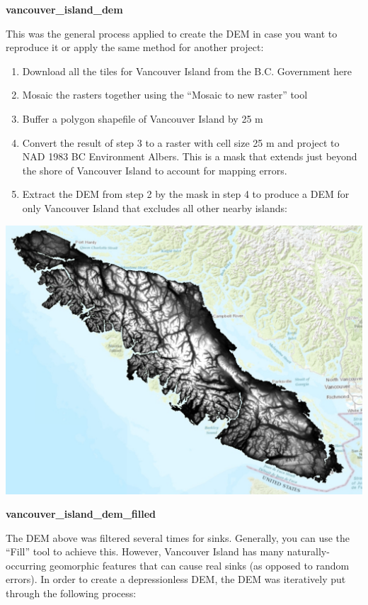 \documentclass[
]{book}
\providecommand{\tightlist}{%
  \setlength{\itemsep}{0pt}\setlength{\parskip}{0pt}}
\begin{document}
\textbf{vancouver\_island\_dem}

This was the general process applied to create the DEM in case you want to reproduce it or apply the same method for another project:

\begin{enumerate}
\def\labelenumi{\arabic{enumi}.}
\tightlist
\item
  Download all the tiles for Vancouver Island from the B.C. Government here
\item
  Mosaic the rasters together using the ``Mosaic to new raster'' tool
\item
  Buffer a polygon shapefile of Vancouver Island by 25 m
\item
  Convert the result of step 3 to a raster with cell size 25 m and project to NAD 1983 BC Environment Albers. This is a mask that extends just beyond the shore of Vancouver Island to account for mapping errors.
\item
  Extract the DEM from step 2 by the mask in step 4 to produce a DEM for only Vancouver Island that excludes all other nearby islands:
\end{enumerate}

\includegraphics[width=0.75\linewidth]{images/02-vancouver-island-dem}

\textbf{vancouver\_island\_dem\_filled}

The DEM above was filtered several times for sinks. Generally, you can use the ``Fill'' tool to achieve this. However, Vancouver Island has many naturally-occurring geomorphic features that can cause real sinks (as opposed to random errors). In order to create a depressionless DEM, the DEM was iteratively put through the following process:
\end{document}
